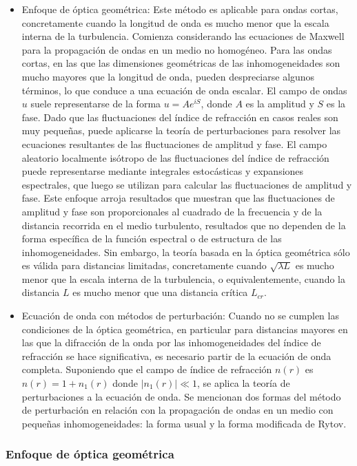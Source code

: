\begin{itemize}
    \item Enfoque de óptica geométrica: Este método es aplicable para ondas cortas, concretamente cuando la longitud de onda es mucho menor que la escala interna de la turbulencia. Comienza considerando las ecuaciones de Maxwell para la propagación de ondas en un medio no homogéneo. Para las ondas cortas, en las que las dimensiones geométricas de las inhomogeneidades son mucho mayores que la longitud de onda, pueden despreciarse algunos términos, lo que conduce a una ecuación de onda escalar. El campo de ondas $u$ suele representarse de la forma $u = A e^{iS}$, donde $A$ es la amplitud y $S$ es la fase. Dado que las fluctuaciones del índice de refracción en casos reales son muy pequeñas, puede aplicarse la teoría de perturbaciones para resolver las ecuaciones resultantes de las fluctuaciones de amplitud y fase. El campo aleatorio localmente isótropo de las fluctuaciones del índice de refracción puede representarse mediante integrales estocásticas y expansiones espectrales, que luego se utilizan para calcular las fluctuaciones de amplitud y fase. Este enfoque arroja resultados que muestran que las fluctuaciones de amplitud y fase son proporcionales al cuadrado de la frecuencia y de la distancia recorrida en el medio turbulento, resultados que no dependen de la forma específica de la función espectral o de estructura de las inhomogeneidades. Sin embargo, la teoría basada en la óptica geométrica sólo es válida para distancias limitadas, concretamente cuando $\sqrt{\lambda  L}$ es mucho menor que la escala interna de la turbulencia, o equivalentemente, cuando la distancia $L$ es mucho menor que una distancia crítica $L_{cr}$.
    \item Ecuación de onda con métodos de perturbación: Cuando no se cumplen las condiciones de la óptica geométrica, en particular para distancias mayores en las que la difracción de la onda por las inhomogeneidades del índice de refracción se hace significativa, es necesario partir de la ecuación de onda completa. Suponiendo que el campo de índice de refracción $n(r)$ es $n(r) = 1 + n_1(r)$ donde $|n_1(r)| \ll 1$, se aplica la teoría de perturbaciones a la ecuación de onda. Se mencionan dos formas del método de perturbación en relación con la propagación de ondas en un medio con pequeñas inhomogeneidades: la forma usual y la forma modificada de Rytov.
\end{itemize}

\subsubsection{Enfoque de óptica geométrica}

